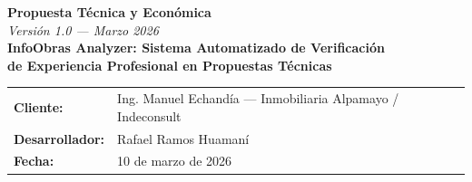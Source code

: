 \documentclass[11pt,a4paper]{article}
\newcommand{\cliente}{Ing. Manuel Echandía}
\newcommand{\empresa}{Inmobiliaria Alpamayo / Indeconsult}
\newcommand{\desarrollador}{Rafael Ramos Huamaní}
\newcommand{\fecha}{10 de marzo de 2026}
\begin{document}
\begin{center}
{\LARGE \textbf{Propuesta Técnica y Económica}}\\[0.2cm]
{\small \textit{Versión 1.0 — Marzo 2026}}\\[0.4cm]
{\large \textbf{InfoObras Analyzer: Sistema Automatizado de Verificación}}\\
{\large \textbf{de Experiencia Profesional en Propuestas Técnicas}}\\[0.3cm]

\begin{tabular}{ll}
\textbf{Cliente:} & \cliente{} — \empresa \\
\textbf{Desarrollador:} & \desarrollador \\
\textbf{Fecha:} & \fecha \\
\end{tabular}
\end{center}

\vspace{1cm}

%
%
%
%
%
\end{document}
